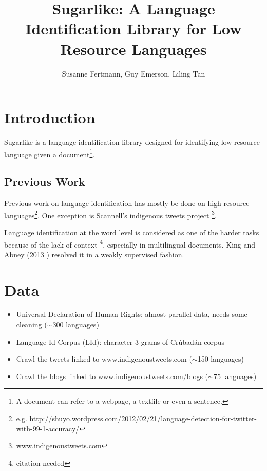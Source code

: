 \documentclass[11pt]{article}
\title{\textbf{Sugarlike: A Language Identification Library for Low Resource Languages}}
\author{Susanne Fertmann, Guy Emerson, Liling Tan}
\date{}
\begin{document}
\maketitle

\section{Introduction}

Sugarlike is a language identification library designed for identifying low resource language given a document\footnote{A document can refer to a webpage, a textfile or even a sentence.}.


\subsection{Previous Work}

Previous work on language identification has mostly be done on high resource languages\footnote{e.g. \href{http://shuyo.wordpress.com/2012/02/21/language-detection-for-twitter-with-99-1-accuracy/}{http://shuyo.wordpress.com/2012/02/21/language-detection-for-twitter-with-99-1-accuracy/}}. One exception is Scannell's indigenous tweets project \footnote{\href{www.indigenoustweets.com}{www.indigenoustweets.com}}. %

Language identification at the word level is considered as one of the harder tasks because of the lack of context \footnote{citation needed}, especially in multilingual documents. King and Abney (2013 \cite{king-abney:2013}) resolved it in a weakly supervised fashion.


\section{Data}


\begin{itemize}
\item Universal Declaration of Human Rights: almost parallel data,  needs some cleaning ($\sim$300 languages)
\item Language Id Corpus (LId): character 3-grams of Crúbadán corpus %
\item Crawl the tweets linked to www.indigenoustweets.com ($\sim$150 languages)
\item Crawl the blogs linked to www.indigenoustweets.com/blogs ($\sim$75 languages)
\end{itemize}
\end{document}
